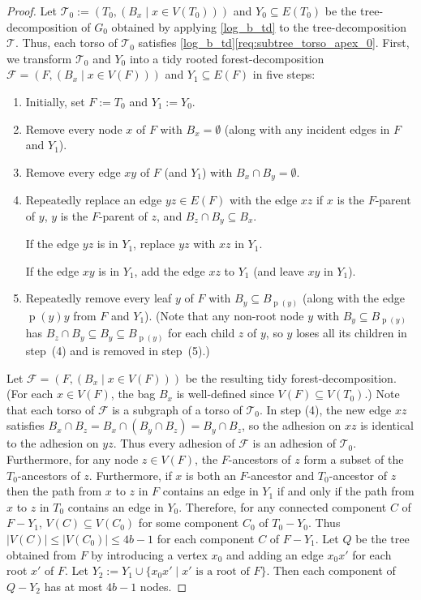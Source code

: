 \documentclass{patmorin}
\renewcommand{\le}{\leqslant}
\DeclareMathOperator{\parent}{p}
\newcommand{\calF}{\mathcal{F}}
\newcommand{\calT}{\mathcal{T}}
\begin{document}
\begin{proof}
  Let $\calT_0:=(T_0,(B_x\mid x\in V(T_0)))$ and $Y_0\subseteq E(T_0)$ be the tree-decomposition of $G_0$ obtained by applying \cref{log_b_td} to the tree-decomposition $\calT$.  Thus, each torso of $\calT_0$ satisfies \cref{log_b_td}\ref{req:subtree_torso_apex_0}.    
  First, we transform $\calT_0$ and $Y_0$ into a tidy rooted forest-decomposition $\calF=(F,(B_x\mid x\in V(F)))$ and $Y_1\subseteq E(F)$ in five steps:
  \begin{enumerate}[nosep,nolistsep,label=(\arabic*)]
    \item Initially, set $F:=T_0$ and $Y_1:=Y_0$.
    \item Remove every node $x$ of $F$ with $B_x=\emptyset$ (along with any incident edges in $F$ and $Y_1$).
    \item Remove every edge $xy$ of $F$ (and $Y_1$) with $B_x\cap B_y=\emptyset$.
    \item Repeatedly replace an edge $yz\in E(F)$ with the edge $xz$ if $x$ is the $F$-parent of $y$, $y$ is the $F$-parent of $z$, and $B_z\cap B_y\subseteq B_x$. 
    
    If the edge $yz$ is in $Y_1$, replace $yz$ with $xz$ in $Y_1$.  
    
    If the edge $xy$ is in $Y_1$, add the edge $xz$ to $Y_1$ (and leave $xy$ in $Y_1$).
    \item Repeatedly remove every leaf $y$ of $F$ with $B_y\subseteq B_{\parent(y)}$ (along with the edge $\parent(y)y$ from $F$ and $Y_1$). (Note that any non-root node $y$ with $B_y\subseteq B_{\parent(y)}$ has $B_z\cap B_y\subseteq B_y\subseteq B_{\parent(y)}$ for each child $z$ of $y$, so $y$ loses all its children in step~(4) and is removed in step~(5).)
  \end{enumerate} 
  Let $\calF=(F,(B_x\mid x\in V(F)))$ be the resulting tidy forest-decomposition.  (For each $x\in V(F)$, the bag $B_x$ is well-defined since $V(F)\subseteq V(T_0)$.) 
  Note that each torso of $\calF$ is a subgraph of a torso of $\calT_0$.
  In step (4), the new edge $xz$ satisfies $B_x\cap B_z = B_x\cap (B_y\cap B_z) = B_y\cap B_z$, so the adhesion on $xz$ is identical to the adhesion on $yz$. Thus every adhesion of $\calF$ is an adhesion of $\calT_0$.
  Furthermore, for any node $z\in V(F)$, the $F$-ancestors of $z$ form a subset of the $T_0$-ancestors of $z$.  Furthermore, if $x$ is both an $F$-ancestor and $T_0$-ancestor of $z$ then the path from $x$ to $z$ in $F$ contains an edge in $Y_1$ if and only if the path from $x$ to $z$ in $T_0$ contains an edge in $Y_0$. Therefore, for any connected component $C$ of $F-Y_1$, $V(C)\subseteq V(C_0)$ for some component $C_0$ of $T_0-Y_0$.  Thus $|V(C)|\le |V(C_0)|\le 4b-1$ for each component $C$ of $F-Y_1$.  Let $Q$ be the tree obtained from $F$ by introducing a vertex $x_0$ and adding an edge $x_0x'$ for each root $x'$ of $F$. Let $Y_2:=Y_1\cup \{x_0x'\mid x'\text{ is a root of }F\}$. Then each component of $Q-Y_2$ has at most $4b-1$ nodes.
  

\end{proof}
\end{document}
